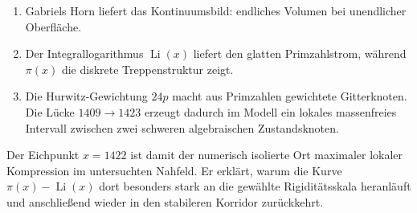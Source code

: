 \documentclass[11pt,a4paper]{article}
\newcommand{\Li}{\operatorname{Li}}
\newcommand{\piPrime}{\pi}
\begin{document}
\begin{enumerate}
  \item Gabriels Horn liefert das Kontinuumsbild: endliches Volumen bei
  unendlicher Oberfläche.
  \item Der Integrallogarithmus \(\Li(x)\) liefert den glatten Primzahlstrom,
  während \(\piPrime(x)\) die diskrete Treppenstruktur zeigt.
  \item Die Hurwitz-Gewichtung \(24p\) macht aus Primzahlen gewichtete
  Gitterknoten. Die Lücke \(1409\to1423\) erzeugt dadurch im Modell ein lokales
  massenfreies Intervall zwischen zwei schweren algebraischen Zustandsknoten.
\end{enumerate}

Der Eichpunkt \(x=1422\) ist damit der numerisch isolierte Ort maximaler lokaler
Kompression im untersuchten Nahfeld. Er erklärt, warum die Kurve
\(\piPrime(x)-\Li(x)\) dort besonders stark an die gewählte Rigiditätsskala
heranläuft und anschließend wieder in den stabileren Korridor zurückkehrt.
\end{document}
